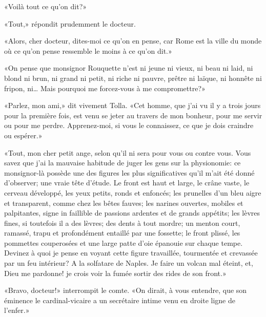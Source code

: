«Voilà tout ce qu'on dit?»

«Tout,» répondit prudemment le docteur.

«Alors, cher docteur, dites-moi ce qu'on en pense, car Rome est la ville
du monde où ce qu'on pense ressemble le moins à ce qu'on dit.»

«On pense que monsignor Rouquette n'est ni jeune ni vieux, ni beau ni
laid, ni blond ni brun, ni grand ni petit, ni riche ni pauvre, prêtre ni
laïque, ni honnête ni fripon, ni\ldots{} Mais pourquoi me forcez-vous à
me compromettre?»

«Parlez, mon ami,» dit vivement Tolla. «Cet homme, que j'ai vu il y a
trois jours pour la première fois, est venu se jeter au travers de mon
bonheur, pour me servir ou pour me perdre. Apprenez-moi, si vous le
connaissez, ce que je dois craindre ou espérer.»

«Tout, mon cher petit ange, selon qu'il ni sera pour vous ou contre
vous. Vous savez que j'ai la mauvaise habitude de juger les gens sur la
physionomie: ce monsignor-là possède une des figures les plus
significatives qu'il m'ait été donné d'observer; une vraie tête d'étude.
Le front est haut et large, le crâne vaste, le cerveau développé, les
yeux petits, ronds et enfoncés; les prunelles d'un bleu aigre et
transparent, comme chez les bêtes fauves; les narines ouvertes, mobiles
et palpitantes, signe in faillible de passions ardentes et de grands
appétits; les lèvres fines, si toutefois il a des lèvres; des dents à
tout mordre; un menton court, ramassé, trapu et profondément entaillé
par une fossette; le front plissé, les pommettes couperosées et une
large patte d'oie épanouie sur chaque tempe. Devinez à quoi je pense en
voyant cette figure travaillée, tourmentée et crevassée par un feu
intérieur? A la solfatare de Naples. Je faire un volcan mal éteint, et,
Dieu me pardonne! je crois voir la fumée sortir des rides de son front.»

«Bravo, docteur!» interrompit le comte. «On dirait, à vous entendre, que
son éminence le cardinal-vicaire a un secrétaire intime venu en droite
ligne de l'enfer.»

